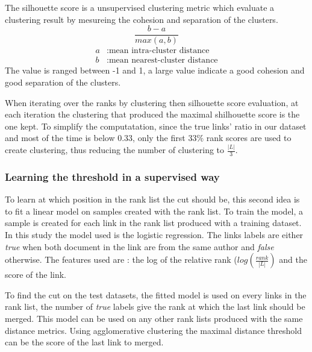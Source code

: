\begin{definition}
  \label{def:silhouette}
  The silhouette score is a unsupervised clustering metric which evaluate a clustering result by mesureing the cohesion and separation of the clusters.
  \begin{equation}
    \frac{b - a}{max(a, b)}
  \end{equation}
  \begin{equation*}
    \begin{split}
      a&: \text{mean intra-cluster distance}\\
      b&: \text{mean nearest-cluster distance}
    \end{split}
  \end{equation*}
  The value is ranged between -1 and 1, a large value indicate a good cohesion and good separation of the clusters.
\end{definition}

When iterating over the ranks by clustering then silhouette score evaluation, at each iteration the clustering that produced the maximal shilhouette score is the one kept.
To simplify the computatation, since the true links' ratio in our dataset and most of the time is below $0.33$, only the first $33\%$ rank scores are used to create clustering, thus reducing the number of clustering to $\frac{|L|}{3}$.

\subsubsection{Learning the threshold in a supervised way}

To learn at which position in the rank list the cut should be, this second idea is to fit a linear model on samples created with the rank list.
To train the model, a sample is created for each link in the rank list produced with a training dataset.
In this study the model used is the logistic regression.
The links labels are either \textit{true} when both document in the link are from the same author and \textit{false} otherwise.
The features used are : the log of the relative rank ($log(\frac{rank}{|L|})$ and the score of the link.

To find the cut on the test datasets, the fitted model is used on every links in the rank list, the number of \textit{true} labels give the rank at which the last link should be merged.
This model can be used on any other rank lists produced with the same distance metrics.
Using agglomerative clustering the maximal distance threshold can be the score of the last link to merged.

